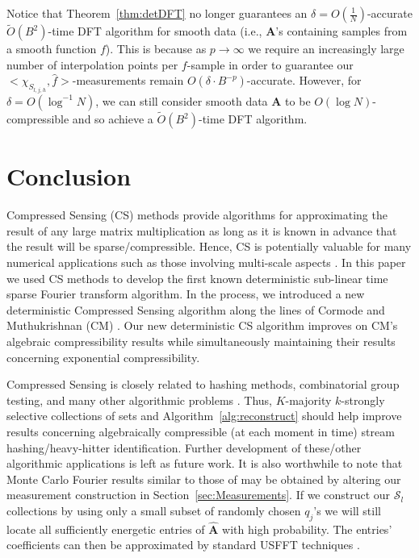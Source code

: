 \documentclass{article}
\begin{document}
Notice that Theorem~\ref{thm:detDFT} no longer guarantees an $\delta = O(\frac{1}{N})$-accurate $\tilde{O}(B^{2})$-time DFT algorithm for smooth data (i.e., \textbf{A}'s containing samples from a smooth function $f$).  This is because as $p \rightarrow \infty$ we require an increasingly large number of interpolation points per $f$-sample in order to guarantee our $<\chi_{S_{l,j,h}}, \hat{f}>$-measurements remain $O(\delta \cdot B^{-p})$-accurate.
However, for $\delta = O(\log^{-1} N)$, we can still consider smooth data \textbf{A} to be $O(\log N)$-compressible and so achieve a $\tilde{O}(B^{2})$-time DFT algorithm.  

\section{Conclusion}
\label{sec:conc}

Compressed Sensing (CS) methods provide algorithms for approximating the result of any large matrix multiplication as long as it is known in advance that the result will be sparse/compressible.  Hence, CS is potentially valuable for many numerical applications such as those involving multi-scale aspects \cite{SparseSpect,SparseSpectM}.  In this paper we used CS methods to develop the first known deterministic sub-linear time sparse Fourier transform algorithm.  In the process, we introduced a new deterministic Compressed Sensing algorithm along the lines of Cormode and Muthukrishnan (CM) \cite{CMDetCS1,CMDetCS2}.  
Our new deterministic CS algorithm improves on CM's algebraic compressibility results while simultaneously maintaining their results concerning exponential compressibility.

Compressed Sensing is closely related to hashing methods, combinatorial group testing, and many other algorithmic problems \cite{FirstDetCS,Crprecis}.  Thus, $K$-majority $k$-strongly selective collections of sets and Algorithm~\ref{alg:reconstruct} should help improve results concerning algebraically compressible (at each moment in time) stream hashing/heavy-hitter identification.  Further development of these/other algorithmic applications is left as future work.  It is also worthwhile to note that Monte Carlo Fourier results similar to those of \cite{AAFFT2} may be obtained by altering our measurement construction in Section~\ref{sec:Measurements}.  If we construct our $\mathcal{S}_{l}$ collections by using only a small subset of randomly chosen $q_{j}$'s we will still locate all sufficiently energetic entries of $\hat{\textbf{A}}$ with high probability.  The entries' coefficients can then be approximated by standard USFFT techniques \cite{AAFFT2,USFFT1,USFFT2,AUSFFTrev}.
\end{document}
